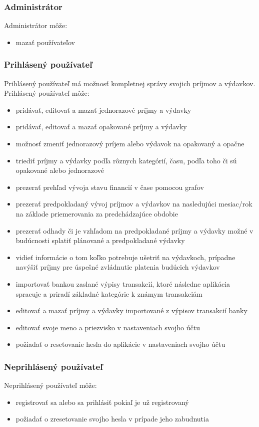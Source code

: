 \documentclass[12pt,oneside]{book}
\begin{document}
\subsubsection{Administrátor}
Administrátor môže:
\begin{itemize}
\item{mazať používateľov}
\end{itemize}

\subsubsection{Prihlásený používateľ}
Prihlásený používateľ má možnosť kompletnej správy svojich príjmov a výdavkov.
Prihlásený používateľ môže:
\begin{itemize}
\item{pridávať, editovať a mazať jednorazové príjmy a výdavky}
\item{pridávať, editovať a mazať opakované príjmy a výdavky}
\item{možnosť zmeniť jednorazový príjem alebo výdavok na opakovaný a opačne}
\item{triediť príjmy a výdavky podľa rôznych kategórií, času, podľa toho či sú opakované alebo jednorazové}
\item{prezerať prehľad vývoja stavu financií v čase pomocou grafov}
\item{prezerať  predpokladaný vývoj príjmov a výdavkov na nasledujúci mesiac/rok na základe priemerovania za predchádzajúce obdobie}
\item{prezerať odhady či je vzhľadom na predpokladané príjmy a výdavky možné v budúcnosti splatiť plánované a predpokladané výdavky}
\item{vidieť informácie o tom koľko potrebuje ušetriť na výdavkoch, prípadne navýšiť príjmy pre úspešné zvládnutie platenia budúcich výdavkov}
\item{importovať bankou zaslané výpisy transakcií, ktoré následne aplikácia spracuje a priradí základné kategórie k známym transakciám}
\item{editovať a mazať príjmy a výdavky importované z výpisov transakcií banky}
\item{editovať svoje meno a priezvisko v nastaveniach svojho účtu}
\item{požiadať o resetovanie hesla do aplikácie v nastaveniach svojho účtu}
\end{itemize}

\subsubsection{Neprihlásený používateľ}
Neprihlásený používateľ môže:
\begin{itemize}
\item{registrovať sa alebo sa prihlásiť pokiaľ je už registrovaný}
\item{požiadať o zresetovanie svojho hesla v prípade jeho zabudnutia}
\end{itemize}
\end{document}
